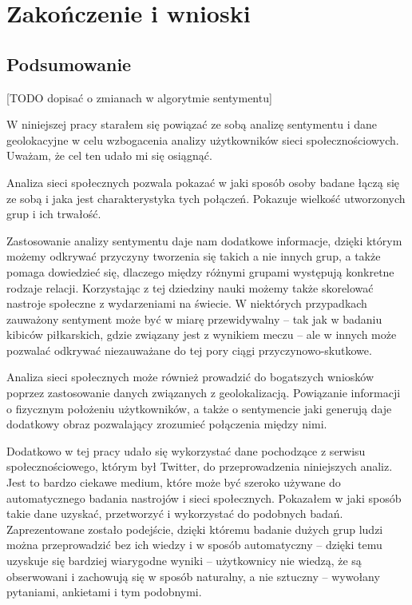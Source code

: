 \chapter{Zakończenie i wnioski}
\section{Podsumowanie}
[TODO dopisać o zmianach w algorytmie sentymentu] 

W niniejszej pracy starałem się powiązać ze sobą analizę sentymentu i dane
geolokacyjne w celu wzbogacenia analizy użytkowników sieci społecznościowych.
Uważam, że cel ten udało mi się osiągnąć.

Analiza sieci społecznych pozwala pokazać w jaki sposób osoby badane łączą się 
ze sobą i jaka jest charakterystyka tych połączeń. Pokazuje wielkość
utworzonych grup i ich trwałość.

Zastosowanie analizy sentymentu daje nam dodatkowe informacje, dzięki którym
możemy odkrywać przyczyny tworzenia się takich a nie innych grup,
a także pomaga dowiedzieć się, dlaczego między różnymi grupami występują
konkretne rodzaje relacji. Korzystając z tej dziedziny nauki możemy także
skorelować nastroje społeczne z wydarzeniami na świecie. W niektórych przypadkach
zauważony sentyment może być w miarę przewidywalny -- tak jak w badaniu 
kibiców piłkarskich, gdzie związany jest z wynikiem meczu -- ale w innych
może pozwalać odkrywać niezauważane do tej pory ciągi przyczynowo-skutkowe.

Analiza sieci społecznych może również prowadzić do bogatszych wniosków
poprzez zastosowanie danych związanych z geolokalizacją. Powiązanie informacji
o fizycznym położeniu użytkowników, a także o sentymencie jaki generują
daje dodatkowy obraz pozwalający zrozumieć połączenia między nimi.

Dodatkowo w tej pracy udało się wykorzystać dane pochodzące z serwisu 
społecznościowego, którym był Twitter, do przeprowadzenia niniejszych analiz.
Jest to bardzo ciekawe medium, które może być szeroko używane do automatycznego
badania nastrojów i sieci społecznych. Pokazałem w jaki sposób takie dane uzyskać,
przetworzyć i wykorzystać do podobnych badań. Zaprezentowane zostało podejście,
dzięki któremu badanie dużych grup ludzi można przeprowadzić bez ich wiedzy
i w sposób automatyczny -- dzięki temu uzyskuje się bardziej wiarygodne wyniki
-- użytkownicy nie wiedzą, że są obserwowani i zachowują się w sposób naturalny,
a nie sztuczny -- wywołany pytaniami, ankietami i tym podobnymi.


